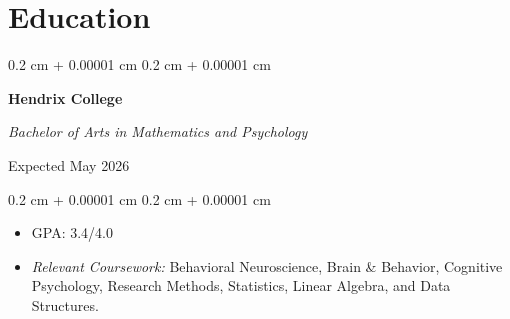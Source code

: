 \documentclass[10pt, letterpaper]{article}
\newenvironment{highlights}{
    \begin{itemize}[
        topsep=0.10 cm,
        parsep=0.10 cm,
        partopsep=0pt,
        itemsep=0pt,
        leftmargin=0.4 cm + 10pt
    ]
}{
    \end{itemize}
} %
\newenvironment{highlightsforbulletentries}{
    \begin{itemize}[
        topsep=0.10 cm,
        parsep=0.10 cm,
        partopsep=0pt,
        itemsep=0pt,
        leftmargin=10pt
    ]
}{
    \end{itemize}
} %
\newenvironment{onecolentry}{
    \begin{adjustwidth}{
        0.2 cm + 0.00001 cm
    }{
        0.2 cm + 0.00001 cm
    }
}{
    \end{adjustwidth}
} %
\newenvironment{twocolentry}[2][]{
    \onecolentry
    \def\secondColumn{#2}
    \setcolumnwidth{\fill, 4.5 cm}
    \begin{paracol}{2}
}{
    \switchcolumn \raggedleft \secondColumn
    \end{paracol}
    \endonecolentry
} %
\let\hrefWithoutArrow\href
\renewcommand{\href}[2]{\hrefWithoutArrow{#1}{\ifthenelse{\equal{#2}{}}{ }{#2 }}}
\begin{document}









\section{Education}


\begin{twocolentry}{
        

        Expected May 2026

    }
    \textbf{Hendrix College}

    \textit{Bachelor of Arts in Mathematics and Psychology}
\end{twocolentry}

\vspace{0.10 cm}

\begin{onecolentry}
    \begin{highlights}
        \item GPA: 3.4/4.0
        \item \textit{Relevant Coursework:} Behavioral Neuroscience, Brain \& Behavior, Cognitive Psychology, Research Methods, Statistics, Linear Algebra, and Data Structures.
    \end{highlights}
\end{onecolentry}
\end{document}
